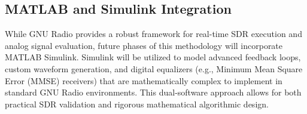 \documentclass[Markos_Delaportas_1316.tex]{subfiles}
\begin{document}
    \subsection{MATLAB and Simulink Integration}
        While GNU Radio provides a robust framework for real-time SDR execution and analog signal evaluation, future phases of this methodology will incorporate MATLAB Simulink. Simulink will be utilized to model advanced feedback loops, custom waveform generation, and digital equalizers (e.g., Minimum Mean Square Error (MMSE) receivers) that are mathematically complex to implement in standard GNU Radio environments. This dual-software approach allows for both practical SDR validation and rigorous mathematical algorithmic design.

    \ifSubfilesClassLoaded{
        \clearpage
        \printbibliography
    }{}
\end{document}
